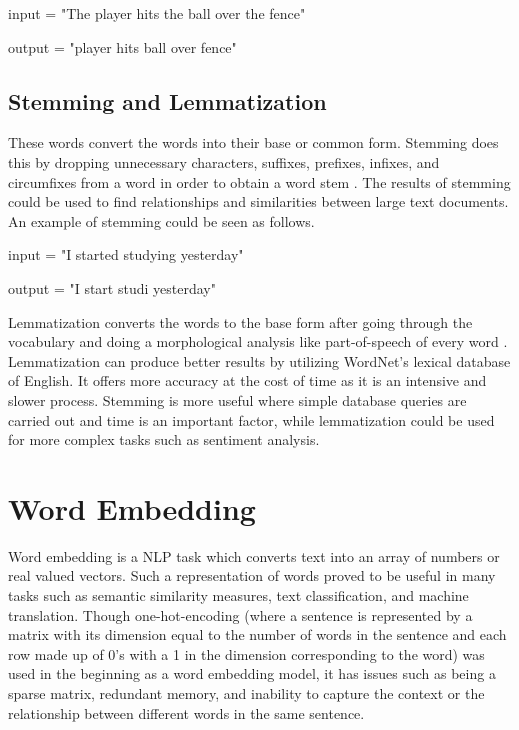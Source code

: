 \vspace{2mm}

input = "The player hits the ball over the fence"

output = "player hits ball over fence"

\subsection{Stemming and Lemmatization}

These words convert the words into their base or common form. Stemming does this by dropping unnecessary characters, suffixes, prefixes, infixes, and circumfixes from a word in order to obtain a word stem \cite{kdnuggets_preprocessing}. The results of stemming could be used to find relationships and similarities between large text documents. An example of stemming could be seen as follows.

\vspace{2mm}

input = "I started studying yesterday"

output = "I start studi yesterday"

Lemmatization converts the words to the base form after going through the vocabulary and doing a morphological analysis like part-of-speech of every word \cite{jurafsky2014speech}. Lemmatization can produce better results by utilizing WordNet's lexical database of English. It offers more accuracy at the cost of time as it is an intensive and slower process. Stemming is more useful where simple database queries are carried out and time is an important factor, while lemmatization could be used for more complex tasks such as sentiment analysis.

\section{Word Embedding}

Word embedding is a NLP task which converts text into an array of numbers or real valued vectors. Such a representation of words proved to be useful in many tasks such as semantic similarity measures, text classification, and machine translation. Though one-hot-encoding (where a sentence is represented by a matrix with its dimension equal to the number of words in the sentence and each row made up of 0's with a 1 in the dimension corresponding to the word) was used in the beginning as a word embedding model, it has issues such as being a sparse matrix, redundant memory, and inability to capture the context or the relationship between different words in the same sentence. 

